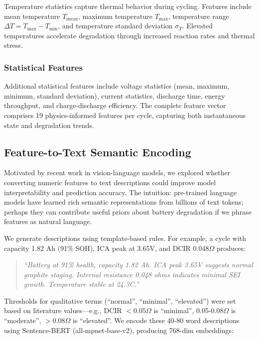 \documentclass{sn-jnl}
\begin{document}
Temperature statistics capture thermal behavior during cycling. Features include mean temperature $T_{\text{mean}}$, maximum temperature $T_{\text{max}}$, temperature range $\Delta T = T_{\text{max}} - T_{\text{min}}$, and temperature standard deviation $\sigma_T$. Elevated temperatures accelerate degradation through increased reaction rates and thermal stress.

\subsubsection{Statistical Features}
\label{subsubsec:stats}

Additional statistical features include voltage statistics (mean, maximum, minimum, standard deviation), current statistics, discharge time, energy throughput, and charge-discharge efficiency. The complete feature vector comprises 19 physics-informed features per cycle, capturing both instantaneous state and degradation trends.

\subsection{Feature-to-Text Semantic Encoding}
\label{subsec:text}

Motivated by recent work in vision-language models, we explored whether converting numeric features to text descriptions could improve model interpretability and prediction accuracy. The intuition: pre-trained language models have learned rich semantic representations from billions of text tokens; perhaps they can contribute useful priors about battery degradation if we phrase features as natural language.

We generate descriptions using template-based rules. For example, a cycle with capacity 1.82 Ah (91\% SOH), ICA peak at 3.65V, and DCIR 0.048$\Omega$ produces:

\begin{quote}
\textit{``Battery at 91\% health, capacity 1.82 Ah. ICA peak 3.65V suggests normal graphite staging. Internal resistance 0.048 ohms indicates minimal SEI growth. Temperature stable at 24.3C.''}
\end{quote}

Thresholds for qualitative terms (``normal'', ``minimal'', ``elevated'') were set based on literature values—e.g., DCIR $<$0.05$\Omega$ is ``minimal'', 0.05-0.08$\Omega$ is ``moderate'', $>$0.08$\Omega$ is ``elevated''. We encode these 40-80 word descriptions using Sentence-BERT (all-mpnet-base-v2), producing 768-dim embeddings:
\end{document}
